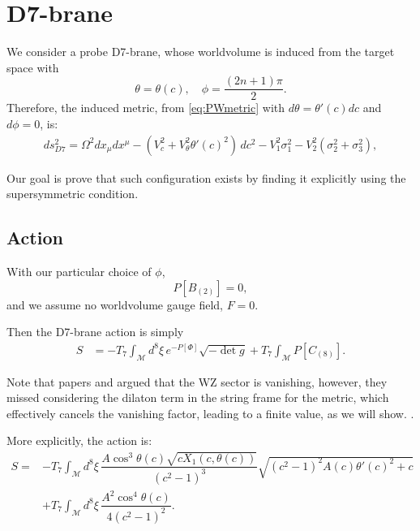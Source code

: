 \section{D7-brane}

We consider a probe D7-brane, whose worldvolume is induced from the target space with 
\begin{equation}
 \theta = \theta(c), \quad \phi=\frac{(2 n + 1)\pi}{2}.
\end{equation}
Therefore, the induced metric, from \eqref{eq:PWmetric} with $d\theta = \theta'(c) dc$ and $d\phi=0$, is:
\begin{align}\label{eq:PWmetric}
ds_{D7}^2 =
\Omega^2 dx_\mu dx^\mu 
- (V_c^2 +V_\theta^2 \theta'(c)^2)\, dc^2 - V_1^2 \sigma_1^2 - V_2^2 (\sigma_2^2 + \sigma_3^2),
\end{align}

Our goal is prove that such configuration exists by finding it explicitly using the supersymmetric condition. 



\subsection{Action}

With our particular choice of $\phi$, 
\begin{equation}
 P[B_{(2)}] = 0,
\end{equation}
and we assume no worldvolume gauge field, $F = 0$. 

Then the D7-brane action is simply
\begin{align}
 S & = -T_7 \int_\mathcal{M} d^8\xi \, e^{-P[\Phi] } \sqrt{-\det g} +
 T_7\int _\mathcal{M} P[C_{(8)}].
\end{align}

Note that papers \cite{Albash:2011nw} and \cite{Evans:2005ti} argued that the WZ sector is vanishing, however, they missed considering the dilaton term in the string frame for the metric, which effectively cancels the vanishing factor, leading to a finite value, as we will show. .

More explicitly, the action is:
\begin{align}\label{eq:ActionWithTheta'}
 S = & -T_7 \int_\mathcal{M} d^8\xi \, \dfrac{A \cos^3\theta (c) \sqrt{c X_1(c, \theta(c))}}{\left(c^2-1\right)^3} \sqrt{\left(c^2-1\right)^2 A(c) \theta '(c)^2+c}\\
     & +T_7\int _\mathcal{M} d^8\xi \, \dfrac{A^2 \cos^4\theta(c)}{4 \left(c^2-1\right)^2}.
\end{align}

